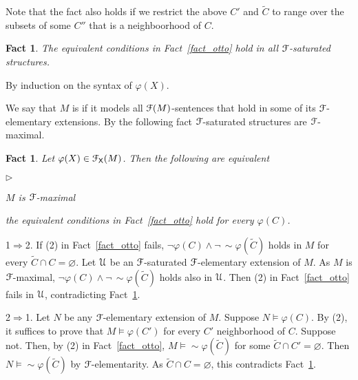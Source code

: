 \documentclass{amsproc}
\makeatletter
\newcommand{\mylabel}[1]{{#1}\hfill}
\renewenvironment{itemize}
  {\begin{list}{$\triangleright$}{%
  \setlength{\parskip}{0mm}
  \setlength{\topsep}{.1\baselineskip}
  \setlength{\rightmargin}{0mm}
  \setlength{\listparindent}{0mm}
  \setlength{\itemindent}{0mm}
  \setlength{\labelwidth}{3ex}
  \setlength{\itemsep}{.1\baselineskip}
  \setlength{\parsep}{.1\baselineskip}
  \setlength{\partopsep}{0mm}
  \setlength{\labelsep}{1ex}
  \setlength{\leftmargin}{\labelwidth+\labelsep}
  \let\makelabel\mylabel}}{%
\end{list}}
\newcounter{thm}
\theoremstyle{mio}
\newtheorem{fact}[thm]{Fact}\tcolorboxenvironment{fact}{mythm}
\providecommand{\proofNameStyle}{\bfseries}
\renewenvironment{proof}[1][\proofname]{\par
  \pushQED{\qed}%
  \normalfont%
  \trivlist
  \item[\hskip\labelsep
        \proofNameStyle
    #1\@addpunct{.}]\ignorespaces
}{%
  \popQED\endtrivlist\@endpefalse
}
\renewcommand*{\emph}[1]{%
   \smash{\tikz[baseline]\node[rectangle, fill=teal!25, rounded corners, inner xsep=0.5ex, inner ysep=0.2ex, anchor=base, minimum height = 2.7ex]{\strut #1};}}
\makeatother
\begin{document}
Note that the fact also holds if we restrict the above $C'$ and $\tilde C$ to range over the subsets of some $C''$ that is a neighboorhood of $C$.

\begin{fact}\label{fact_saturation}
  The equivalent conditions in Fact~\ref{fact_otto} hold in all ${\EuScript F}$-saturated structures.
\end{fact}

\begin{proof}
  By induction on the syntax of $\varphi(X)$.
\end{proof}

We say that $M$ is \emph{${\EuScript F}$-maximal\/} if it models all ${\EuScript F}(M)$-sentences that hold in some of its ${\EuScript F}$-elementary extensions.
By the following fact ${\EuScript F}$-saturated structures are ${\EuScript F}$-maximal.

\begin{fact}\label{fact_maximal}
  Let $\varphi(X)\in{\EuScript F}_{\sf X}(M)$.
  Then the following are equivalent
  \begin{itemize}
    \item [1.] $M$ is ${\EuScript F}$-maximal
    \item [2.] the equivalent conditions in Fact~\ref{fact_otto} hold for every $\varphi(C)$. 
  \end{itemize}
\end{fact}

\begin{proof}
  1$\Rightarrow$2. If (2) in Fact~\ref{fact_otto} fails, $\neg\varphi(C)\wedge\neg\,{\sim}\varphi(\tilde C)$ holds in $M$ for every $\tilde C\cap C=\varnothing$.
  Let ${\EuScript U}$ be an ${\EuScript F}$-saturated ${\EuScript F}$-elementary extension of $M$.
  As $M$ is ${\EuScript F}$-maximal, $\neg\varphi(C)\wedge\neg\,{\sim}\varphi(\tilde C)$ holds also in ${\EuScript U}$.
  Then (2) in Fact~\ref{fact_otto} fails in ${\EuScript U}$, contradicting Fact~\ref{fact_saturation}.

  2$\Rightarrow$1. 
  Let $N$ be any ${\EuScript F}$-elementary extension of $M$.
  Suppose $N\models\varphi(C)$.
  By (2), it suffices to prove that $M\models\varphi(C')$ for every $C'$ neighborhood of $C$.
  Suppose not. Then, by (2) in Fact~\ref{fact_otto}, $M\models{\sim}\varphi(\tilde C)$ for some $\tilde C\cap C'=\varnothing$.
  Then $N\models{\sim}\varphi(\tilde C)$ by ${\EuScript F}$-elementarity.
  As $\tilde C\cap C=\varnothing$, this contradicts Fact~\ref{fact_saturation}.
\end{proof}
\end{document}
